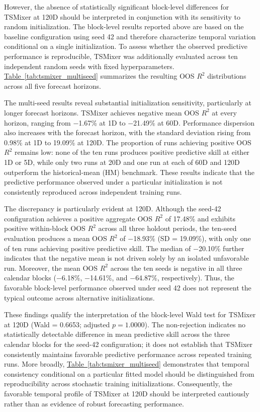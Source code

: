 \documentclass[12pt,twoside]{ord}
\begin{document}
However, the absence of statistically significant block-level differences for TSMixer at 120D should be interpreted in conjunction with its sensitivity to random initialization. The block-level results reported above are based on the baseline configuration using seed 42 and therefore characterize temporal variation conditional on a single initialization. To assess whether the observed predictive performance is reproducible, TSMixer was additionally evaluated across ten independent random seeds with fixed hyperparameters. \hyperref[tab:tsmixer_multiseed]{Table~\ref*{tab:tsmixer_multiseed}} summarizes the resulting OOS $R^2$ distributions across all five forecast horizons.

The multi-seed results reveal substantial initialization sensitivity, particularly at longer forecast horizons. TSMixer achieves negative mean OOS $R^2$ at every horizon, ranging from $-$1.67\% at 1D to $-$21.49\% at 60D. Performance dispersion also increases with the forecast horizon, with the standard deviation rising from 0.98\% at 1D to 19.09\% at 120D. The proportion of runs achieving positive OOS $R^2$ remains low: none of the ten runs produces positive predictive skill at either 1D or 5D, while only two runs at 20D and one run at each of 60D and 120D outperform the historical-mean (HM) benchmark. These results indicate that the predictive performance observed under a particular initialization is not consistently reproduced across independent training runs.

The discrepancy is particularly evident at 120D. Although the seed-42 configuration achieves a positive aggregate OOS $R^2$ of 17.48\% and exhibits positive within-block OOS $R^2$ across all three holdout periods, the ten-seed evaluation produces a mean OOS $R^2$ of $-$18.93\% (SD = 19.09\%), with only one of ten runs achieving positive predictive skill. The median of $-$20.10\% further indicates that the negative mean is not driven solely by an isolated unfavorable run. Moreover, the mean OOS $R^2$ across the ten seeds is negative in all three calendar blocks ($-$6.18\%, $-$14.61\%, and $-$64.87\%, respectively). Thus, the favorable block-level performance observed under seed 42 does not represent the typical outcome across alternative initializations.

These findings qualify the interpretation of the block-level Wald test for TSMixer at 120D (Wald = 0.6653; adjusted $p = 1.0000$). The non-rejection indicates no statistically detectable difference in mean predictive skill across the three calendar blocks for the seed-42 configuration; it does not establish that TSMixer consistently maintains favorable predictive performance across repeated training runs. More broadly, \hyperref[tab:tsmixer_multiseed]{Table~\ref*{tab:tsmixer_multiseed}} demonstrates that temporal consistency conditional on a particular fitted model should be distinguished from reproducibility across stochastic training initializations. Consequently, the favorable temporal profile of TSMixer at 120D should be interpreted cautiously rather than as evidence of robust forecasting performance.
\end{document}
